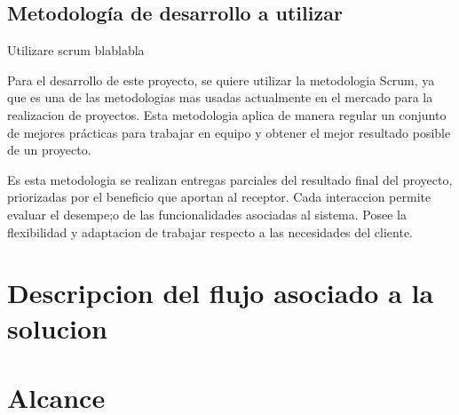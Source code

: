\subsection{Metodología de desarrollo a utilizar}

Utilizare scrum blablabla

Para el desarrollo de este proyecto, se quiere utilizar la metodologia Scrum, ya que es una de las metodologias mas usadas actualmente en el mercado para la realizacion de proyectos. Esta metodologia aplica de manera regular un conjunto de mejores prácticas para trabajar en equipo y obtener el mejor resultado posible de un proyecto.

Es esta metodologia se realizan entregas parciales del resultado final del proyecto, priorizadas por el beneficio que aportan al receptor. Cada interaccion permite evaluar el desempe;o de las funcionalidades asociadas al sistema. Posee la flexibilidad y adaptacion de trabajar respecto a las necesidades del cliente. 



\section{Descripcion del flujo asociado a la solucion}


\section{Alcance}

